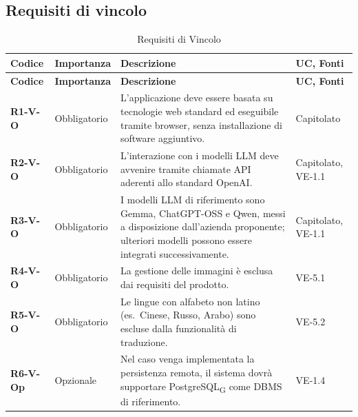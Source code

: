 \subsection{Requisiti di vincolo}
\begin{longtable}{|p{2.5cm}|p{2.2cm}|p{6.8cm}|p{2.7cm}|}
	\caption{Requisiti di Vincolo} \\
	\hline
	\rowcolor{primarycolor!10}
	\textbf{Codice} & \textbf{Importanza} & \textbf{Descrizione} & \textbf{UC, Fonti} \\
	\hline
	\endfirsthead
	\hline
	\rowcolor{primarycolor!10}
	\textbf{Codice} & \textbf{Importanza} & \textbf{Descrizione} & \textbf{UC, Fonti} \\
	\hline
	\endhead

	\textbf{R1-V-O} & Obbligatorio & L'applicazione deve essere basata su tecnologie web standard ed eseguibile tramite browser, senza installazione di software aggiuntivo. & Capitolato \\ \hline
	\textbf{R2-V-O} & Obbligatorio & L'interazione con i modelli LLM deve avvenire tramite chiamate API aderenti allo standard OpenAI. & Capitolato, VE-1.1 \\ \hline
	\textbf{R3-V-O} & Obbligatorio & I modelli LLM di riferimento sono Gemma, ChatGPT-OSS e Qwen, messi a disposizione dall'azienda proponente; ulteriori modelli possono essere integrati successivamente. & Capitolato, VE-1.1 \\ \hline
	\textbf{R4-V-O} & Obbligatorio & La gestione delle immagini è esclusa dai requisiti del prodotto. & VE-5.1 \\ \hline
	\textbf{R5-V-O} & Obbligatorio & Le lingue con alfabeto non latino (es.\ Cinese, Russo, Arabo) sono escluse dalla funzionalità di traduzione. & VE-5.2 \\ \hline
	\textbf{R6-V-Op} & Opzionale & Nel caso venga implementata la persistenza remota, il sistema dovrà supportare PostgreSQL\textsubscript{G} come DBMS di riferimento. & VE-1.4 \\ \hline

\end{longtable}

